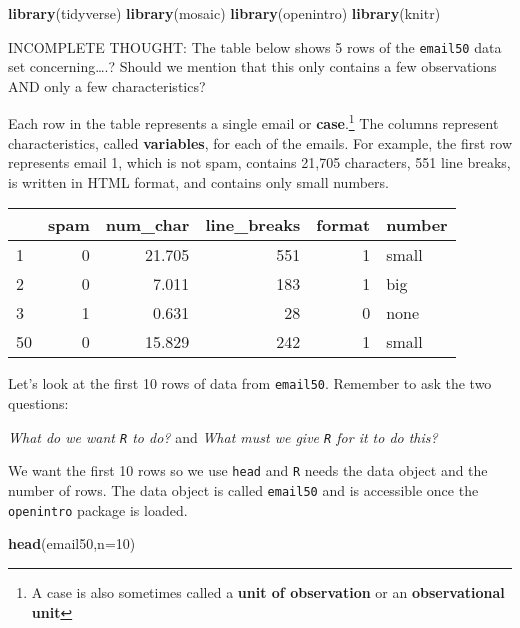 \documentclass[
]{article}
\newenvironment{Shaded}{\begin{snugshade}}{\end{snugshade}}
\newcommand{\DataTypeTok}[1]{\textcolor[rgb]{0.13,0.29,0.53}{#1}}
\newcommand{\DecValTok}[1]{\textcolor[rgb]{0.00,0.00,0.81}{#1}}
\newcommand{\KeywordTok}[1]{\textcolor[rgb]{0.13,0.29,0.53}{\textbf{#1}}}
\newcommand{\NormalTok}[1]{#1}
\begin{document}
\begin{Shaded}
\begin{Highlighting}[]
\KeywordTok{library}\NormalTok{(tidyverse)}
\KeywordTok{library}\NormalTok{(mosaic)}
\KeywordTok{library}\NormalTok{(openintro)}
\KeywordTok{library}\NormalTok{(knitr)}
\end{Highlighting}
\end{Shaded}

INCOMPLETE THOUGHT: The table below shows 5 rows of the \texttt{email50}
data set concerning\ldots{}.? Should we mention that this only contains
a few observations AND only a few characteristics?

Each row in the table represents a single email or
\textbf{case}.\footnote{A case is also sometimes called a \textbf{unit
  of observation} or an \textbf{observational unit}} The columns
represent characteristics, called \textbf{variables}, for each of the
emails. For example, the first row represents email 1, which is not
spam, contains 21,705 characters, 551 line breaks, is written in HTML
format, and contains only small numbers.

\begin{longtable}[]{@{}lrrrrl@{}}
\toprule
& spam & num\_char & line\_breaks & format & number\tabularnewline
\midrule
\endhead
1 & 0 & 21.705 & 551 & 1 & small\tabularnewline
2 & 0 & 7.011 & 183 & 1 & big\tabularnewline
3 & 1 & 0.631 & 28 & 0 & none\tabularnewline
50 & 0 & 15.829 & 242 & 1 & small\tabularnewline
\bottomrule
\end{longtable}

Let's look at the first 10 rows of data from \texttt{email50}. Remember
to ask the two questions:

\emph{What do we want \texttt{R} to do?} and \emph{What must we give
\texttt{R} for it to do this?}

We want the first 10 rows so we use \texttt{head} and \texttt{R} needs
the data object and the number of rows. The data object is called
\texttt{email50} and is accessible once the \texttt{openintro} package
is loaded.

\begin{Shaded}
\begin{Highlighting}[]
\KeywordTok{head}\NormalTok{(email50,}\DataTypeTok{n=}\DecValTok{10}\NormalTok{)}
\end{Highlighting}
\end{Shaded}
\end{document}
